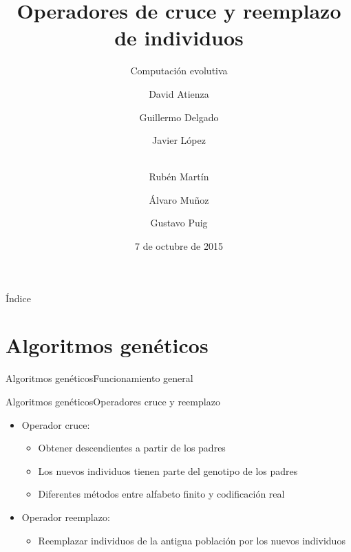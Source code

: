 \documentclass[10pt]{beamer}
\title{Operadores de cruce y reemplazo de individuos}
\subtitle{Computación evolutiva}  %
\date{7 de octubre de 2015}
\author{
David Atienza \and
Guillermo Delgado \and
Javier López \and \\
Rubén Martín \and
Álvaro Muñoz \and
Gustavo Puig
}
\institute[
] %
{%
 Departamento de Inteligencia Artificial
  
}
\begin{document}
{%
\begin{frame} %
  \titlepage
\end{frame}}

\begin{frame}{Índice}{}
\tableofcontents
\end{frame}

\section{Algoritmos genéticos}

\begin{frame}{Algoritmos genéticos}{Funcionamiento general}
\end{frame}

\begin{frame}{Algoritmos genéticos}{Operadores cruce y reemplazo}

	\begin{itemize}
		\item Operador cruce:
			\begin{itemize}
				 \item Obtener descendientes a partir de los padres
				 \item Los nuevos individuos tienen parte del genotipo de los padres
				 \item Diferentes métodos entre alfabeto finito y codificación real
			\end{itemize}
		\item Operador reemplazo:
			\begin{itemize}
				\item Reemplazar individuos de la antigua población por los nuevos individuos
			\end{itemize}
	\end{itemize}
\end{frame}
\end{document}
